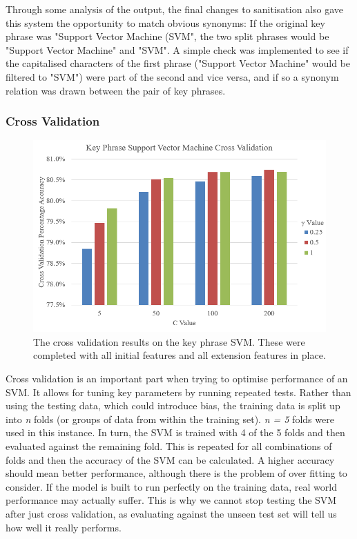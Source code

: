 Through some analysis of the output, the final changes to sanitisation also gave this system the opportunity to match obvious synonyms: If the original key phrase was "Support Vector Machine (SVM", the two split phrases would be "Support Vector Machine" and "SVM". A simple check was implemented to see if the capitalised characters of the first phrase ("Support Vector Machine" would be filtered to "SVM") were part of the second and vice versa, and if so a synonym relation was drawn between the pair of key phrases. 

\subsubsection*{Cross Validation}

\begin{figure}
	\includegraphics[width=\textwidth]{img/kpsvmcrossvalidation.png}
	\caption[Key Phrase SVM Cross Validation]{The cross validation results on the key phrase SVM. These were completed with all initial features and all extension features in place.}
	\label{figure:kpsvmcv}
\end{figure}

Cross validation is an important part when trying to optimise performance of an SVM. It allows for tuning key parameters by running repeated tests. Rather than using the testing data, which could introduce bias, the training data is split up into \textit{n} folds (or groups of data from within the training set). \textit{n = 5} folds were used in this instance. In turn, the SVM is trained with 4 of the 5 folds and then evaluated against the remaining fold. This is repeated for all combinations of folds and then the accuracy of the SVM can be calculated. A higher accuracy should mean better performance, although there is the problem of over fitting to consider. If the model is built to run perfectly on the training data, real world performance may actually suffer. This is why we cannot stop testing the SVM after just cross validation, as evaluating against the unseen test set will tell us how well it really performs. 

